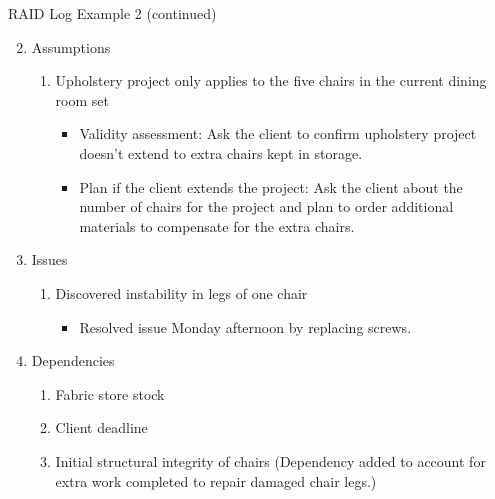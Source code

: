 \documentclass[aspectratio=169]{beamer}
\begin{document}
\begin{frame}{RAID Log Example 2 (continued)}
    \begin{enumerate}
        \setcounter{enumi}{1}
        \item Assumptions
        \begin{enumerate}
            \item Upholstery project only applies to the five chairs in the current dining room set
            \begin{itemize}
                \item Validity assessment: Ask the client to confirm upholstery project doesn't extend to extra chairs kept in storage.
                \item Plan if the client extends the project: Ask the client about the number of chairs for the project and plan to order additional materials to compensate for the extra chairs.
            \end{itemize}
        \end{enumerate}
        \item Issues
        \begin{enumerate}
            \item Discovered instability in legs of one chair
            \begin{itemize}
                \item Resolved issue Monday afternoon by replacing screws.
            \end{itemize}
        \end{enumerate}
        \item Dependencies
        \begin{enumerate}
            \item Fabric store stock
            \item Client deadline
            \item Initial structural integrity of chairs
            (Dependency added to account for extra work completed to repair damaged chair legs.)
        \end{enumerate}
    \end{enumerate}
\end{frame}
\end{document}
